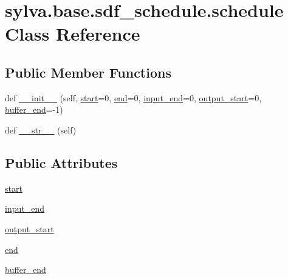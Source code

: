 \hypertarget{classsylva_1_1base_1_1sdf__schedule_1_1schedule}{}\section{sylva.\+base.\+sdf\+\_\+schedule.\+schedule Class Reference}
\label{classsylva_1_1base_1_1sdf__schedule_1_1schedule}
\subsection*{Public Member Functions}
\begin{DoxyCompactItemize}
\item 
def \hyperlink{classsylva_1_1base_1_1sdf__schedule_1_1schedule_a5af35d66cbfe25e361e92cb9a22cfd3d}{\+\_\+\+\_\+init\+\_\+\+\_\+} (self, \hyperlink{classsylva_1_1base_1_1sdf__schedule_1_1schedule_a790c6790e606e4f15520e042d390de55}{start}=0, \hyperlink{classsylva_1_1base_1_1sdf__schedule_1_1schedule_ab06ad02f1a616a347725c882c604cf07}{end}=0, \hyperlink{classsylva_1_1base_1_1sdf__schedule_1_1schedule_aac507c8e28cb068750e8af38e58fed80}{input\+\_\+end}=0, \hyperlink{classsylva_1_1base_1_1sdf__schedule_1_1schedule_a57139c55f01d3c555a4d049ca85a5e8f}{output\+\_\+start}=0, \hyperlink{classsylva_1_1base_1_1sdf__schedule_1_1schedule_a920a38f22e2fd549a4d5d2377bfb4c3c}{buffer\+\_\+end}=-\/1)
\item 
def \hyperlink{classsylva_1_1base_1_1sdf__schedule_1_1schedule_a22e37ed6ccea017541f563714c0af989}{\+\_\+\+\_\+str\+\_\+\+\_\+} (self)
\end{DoxyCompactItemize}
\subsection*{Public Attributes}
\begin{DoxyCompactItemize}
\item 
\hyperlink{classsylva_1_1base_1_1sdf__schedule_1_1schedule_a790c6790e606e4f15520e042d390de55}{start}
\item 
\hyperlink{classsylva_1_1base_1_1sdf__schedule_1_1schedule_aac507c8e28cb068750e8af38e58fed80}{input\+\_\+end}
\item 
\hyperlink{classsylva_1_1base_1_1sdf__schedule_1_1schedule_a57139c55f01d3c555a4d049ca85a5e8f}{output\+\_\+start}
\item 
\hyperlink{classsylva_1_1base_1_1sdf__schedule_1_1schedule_ab06ad02f1a616a347725c882c604cf07}{end}
\item 
\hyperlink{classsylva_1_1base_1_1sdf__schedule_1_1schedule_a920a38f22e2fd549a4d5d2377bfb4c3c}{buffer\+\_\+end}
\end{DoxyCompactItemize}
